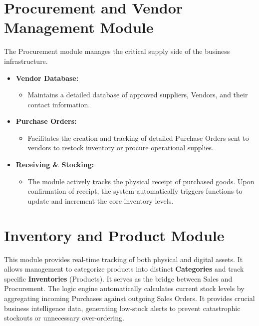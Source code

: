 ﻿\documentclass[12pt,a4paper]{report}
\begin{document}
\section*{Procurement and Vendor Management Module}
The Procurement module manages the critical supply side of the business infrastructure.
\begin{itemize}
    \item \textbf{Vendor Database:}
    \begin{itemize}
        \item Maintains a detailed database of approved suppliers, Vendors, and their contact information.
    \end{itemize}
    \item \textbf{Purchase Orders:}
    \begin{itemize}
        \item Facilitates the creation and tracking of detailed Purchase Orders sent to vendors to restock inventory or procure operational supplies.
    \end{itemize}
    \item \textbf{Receiving \& Stocking:}
    \begin{itemize}
        \item The module actively tracks the physical receipt of purchased goods. Upon confirmation of receipt, the system automatically triggers functions to update and increment the core inventory levels.
    \end{itemize}
\end{itemize}

\section*{Inventory and Product Module}
This module provides real-time tracking of both physical and digital assets. It allows management to categorize products into distinct \textbf{Categories} and track specific \textbf{Inventories} (Products). It serves as the bridge between Sales and Procurement. The logic engine automatically calculates current stock levels by aggregating incoming Purchases against outgoing Sales Orders. It provides crucial business intelligence data, generating low-stock alerts to prevent catastrophic stockouts or unnecessary over-ordering.
\end{document}
